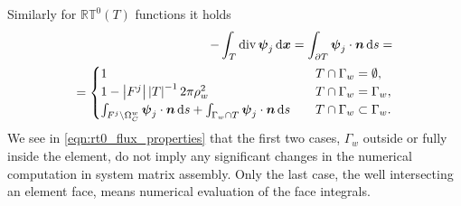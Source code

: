Similarly for $\mathbb{RT}^0(T)$ functions it holds
\begin{align} \label{eqn:rt0_flux_properties}
    -\int_{T} {\rm div}\,\mathbf{\boldsymbol{\psi}}_{j}\,{\rm d}\mathbf{\boldsymbol{x}}
    = \int_{\partial T} \mathbf{\boldsymbol{\psi}}_{j}\cdot\mathbf{\boldsymbol{n}} \,{\rm d} s = \nonumber\\
    = \begin{cases}
        1 & \quad T \cap \Gamma_w=\emptyset, \\
        1-\left|F^j\right|\left|T\right|^{-1}2\pi\rho_w^2 & \quad T \cap \Gamma_w=\Gamma_w, \\
        \int_{F^j\setminus \Omega^w_C} \mathbf{\boldsymbol{\psi}}_j\cdot\mathbf{\boldsymbol{n}} \,{\rm d} s
            +\int_{\Gamma_w\cap T} \mathbf{\boldsymbol{\psi}}_j\cdot\mathbf{\boldsymbol{n}} \,{\rm d} s
            &\quad T \cap \Gamma_w\subset\Gamma_w. \\
        \end{cases}
\end{align}
%
We see in \eqref{eqn:rt0_flux_properties} that the first two cases, $\Gamma_w$ outside
or fully inside the element, do not imply any significant changes in the numerical computation
in system matrix assembly. Only the last case, the well intersecting an element face, means
numerical evaluation of the face integrals.

